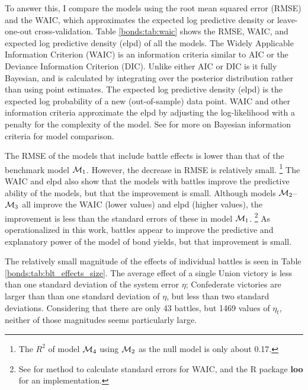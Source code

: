 To answer this, I compare the models using the root mean squared error (RMSE) and the WAIC, which approximates the expected log predictive density or leave-one-out cross-validation.
Table \ref{bonds:tab:waic} shows the RMSE, WAIC, and expected log predictive density (elpd) of all the models.
The Widely Applicable Information Criterion (WAIC) \parencite{Watanabe2010} is an information criteria similar to AIC or the Deviance Information Criterion (DIC).
Unlike either AIC or DIC is it fully Bayesian, and is calculated by integrating over the posterior distribution rather than using point estimates.
The expected log predictive density (elpd) is the expected log probability of a new (out-of-sample) data point.
WAIC and other information criteria approximate the elpd by adjusting the  log-likelihood with a penalty for the complexity of the model.
See \textcites[Ch. 7]{GelmanCarlinSternEtAl2013a}{GelmanHwangVehtari2014a}{GelmanVehtari2014a} for more on Bayesian information criteria for model comparison.

The  RMSE of the models that include battle effects is lower than that of the benchmark model $\mathcal{M}_{\text{1}}$. 
However, the decrease in  RMSE is relatively small.%
\footnote{The $R^{2}$ of model $\mathcal{M}_{\text{4}}$ using $\mathcal{M}_{\text{2}}$ as the null model is only about 0.17.}
The WAIC and elpd also show that the models with battles improve the predictive ability of the models, but that the improvement is small.
Although models $\mathcal{M}_{\text{2}}$--$\mathcal{M}_{\text{3}}$ all improve the WAIC (lower values) and elpd (higher values), the improvement is less than the standard errors of these  in model $\mathcal{M}_{\text{1}}$.%
\footnote{See \textcite{GelmanVehtari2014a} for method to calculate standard errors for WAIC, and the R package \textbf{loo} for an implementation.}
As operationalized in this work, battles appear to improve the predictive and explanatory power of the model of bond yields, but that improvement is small.

The relatively small magnitude of the effects of individual battles is seen in Table \ref{bonds:tab:blt_effects_size}.
The average effect of a single Union victory is less than one standard deviation of the system error $\eta$; Confederate victories are larger than than one standard deviation of $\eta$, but less than two standard deviations.
Considering that there are only 43 battles, but 1469 values of $\eta_{t}$, neither of those magnitudes seems particularly large.

